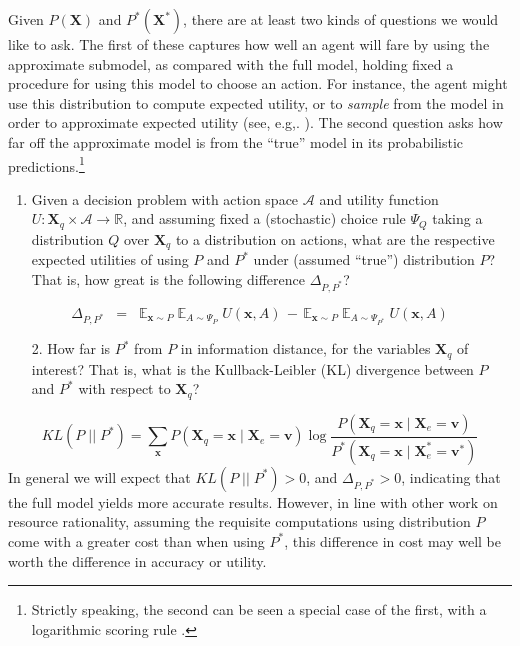 \documentclass[10pt,letterpaper]{article}
\begin{document}
Given $P(\textbf{X})$ and $P^*(\textbf{X}^*)$, there are at least two kinds of questions we would like to ask. The first of these captures how well an agent will fare by using the approximate submodel, as compared with the full model, holding fixed a procedure for using this model to choose an action. For instance, the agent might use this distribution to compute expected utility, or to \emph{sample} from the model in order to approximate expected utility (see, e.g,. \citealt{Vul2014}). The second question asks how far off the approximate model is from the ``true'' model in its probabilistic predictions.\footnote{Strictly speaking, the second can be seen a special case of the first, with a logarithmic scoring rule \citep{Bernardo}.} \begin{enumerate}
  \item Given a decision problem with action space $\mathcal{A}$ and utility function $U:\textbf{X}_q\times \mathcal{A} \rightarrow\mathbb{R}$, and assuming fixed a (stochastic) choice rule $\Psi_Q$ taking a distribution $Q$ over $\textbf{X}_q$ to a distribution on actions, what are the respective expected utilities of using $P$ and $P^*$ under (assumed ``true'') distribution $P$? That is, how great is the following difference $\Delta_{P,P^*}$? \end{enumerate}
  $$\Delta_{P,P^*} \;\; = \;\; \mathbb{E}_{\textbf{x}\sim P}\;\mathbb{E}_{A \sim \Psi_{P}}\;U(\textbf{x},A) \,-\, \mathbb{E}_{\textbf{x} \sim P}\;\mathbb{E}_{A \sim \Psi_{P^*}}\;U(\textbf{x},A)$$
  \begin{enumerate}
  \item[2.] How far is $P^*$ from $P$ in information distance, for the variables $\textbf{X}_q$ of interest? That is, what is the Kullback-Leibler (KL) divergence between $P$ and $P^*$ with respect to $\textbf{X}_q$?
\end{enumerate}$$KL(P \;||\; P^*)  =  \sum_{\textbf{x}} P(\textbf{X}_q = \textbf{x} \mid \textbf{X}_{e} = \textbf{v})\; \mbox{log} \; \frac{P(\textbf{X}_q = \textbf{x} \mid \textbf{X}_{e} = \textbf{v})}{P^*(\textbf{X}_q = \textbf{x} \mid \textbf{X}^*_{e} = \textbf{v}^*)}$$
In general we will expect that $KL(P \;||\; P^*) > 0$, and 
$\Delta_{P,P^*}>0$, indicating that the full model yields more accurate results. However, in line with other work on resource rationality, assuming the requisite computations using distribution $P$ come with a greater cost than when using $P^*$, this difference in cost may well be worth the difference in accuracy or utility.
\end{document}
